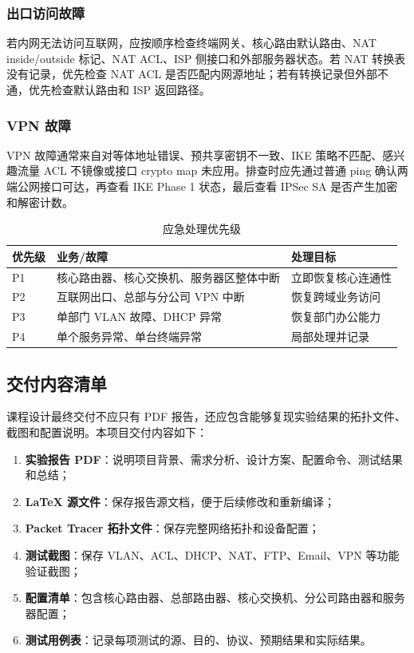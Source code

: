 \documentclass[12pt,a4paper]{ctexart}
\begin{document}
\subsubsection{出口访问故障}

若内网无法访问互联网，应按顺序检查终端网关、核心路由默认路由、NAT inside/outside 标记、NAT ACL、ISP 侧接口和外部服务器状态。若 NAT 转换表没有记录，优先检查 NAT ACL 是否匹配内网源地址；若有转换记录但外部不通，优先检查默认路由和 ISP 返回路径。

\subsubsection{VPN 故障}

VPN 故障通常来自对等体地址错误、预共享密钥不一致、IKE 策略不匹配、感兴趣流量 ACL 不镜像或接口 crypto map 未应用。排查时应先通过普通 ping 确认两端公网接口可达，再查看 IKE Phase 1 状态，最后查看 IPSec SA 是否产生加密和解密计数。

\begin{table}[H]
\centering
\caption{应急处理优先级}
\label{tab:emergency-priority}
\begin{tabular}{|p{3cm}|p{4cm}|p{5cm}|}
\hline
\textbf{优先级} & \textbf{业务/故障} & \textbf{处理目标} \\ \hline
P1 & 核心路由器、核心交换机、服务器区整体中断 & 立即恢复核心连通性 \\ \hline
P2 & 互联网出口、总部与分公司 VPN 中断 & 恢复跨域业务访问 \\ \hline
P3 & 单部门 VLAN 故障、DHCP 异常 & 恢复部门办公能力 \\ \hline
P4 & 单个服务异常、单台终端异常 & 局部处理并记录 \\ \hline
\end{tabular}
\end{table}

\subsection{交付内容清单}

课程设计最终交付不应只有 PDF 报告，还应包含能够复现实验结果的拓扑文件、截图和配置说明。本项目交付内容如下：

\begin{enumerate}[label=(\arabic*), leftmargin=2em]
    \item \textbf{实验报告 PDF}：说明项目背景、需求分析、设计方案、配置命令、测试结果和总结；
    \item \textbf{LaTeX 源文件}：保存报告源文档，便于后续修改和重新编译；
    \item \textbf{Packet Tracer 拓扑文件}：保存完整网络拓扑和设备配置；
    \item \textbf{测试截图}：保存 VLAN、ACL、DHCP、NAT、FTP、Email、VPN 等功能验证截图；
    \item \textbf{配置清单}：包含核心路由器、总部路由器、核心交换机、分公司路由器和服务器配置；
    \item \textbf{测试用例表}：记录每项测试的源、目的、协议、预期结果和实际结果。
\end{enumerate}
\end{document}
